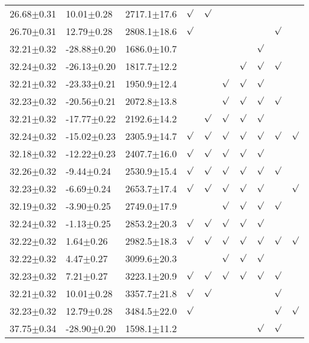 \begin{table}[h]
\begin{center}
\begin{tabular}{llllllllll}
26.68$\pm$0.31 & 10.01$\pm$0.28 & 2717.1$\pm$17.6& $\surd$ & $\surd$ & & & & & \\
26.70$\pm$0.31 & 12.79$\pm$0.28 & 2808.1$\pm$18.6& $\surd$ & & & & & $\surd$ & \\
32.21$\pm$0.32 & -28.88$\pm$0.20 & 1686.0$\pm$10.7& & & & & $\surd$ & & \\
32.24$\pm$0.32 & -26.13$\pm$0.20 & 1817.7$\pm$12.2& & & & $\surd$ & $\surd$ & $\surd$ & \\
32.21$\pm$0.32 & -23.33$\pm$0.21 & 1950.9$\pm$12.4& & & $\surd$ & $\surd$ & $\surd$ & & \\
32.23$\pm$0.32 & -20.56$\pm$0.21 & 2072.8$\pm$13.8& & & $\surd$ & $\surd$ & $\surd$ & $\surd$ & \\
32.21$\pm$0.32 & -17.77$\pm$0.22 & 2192.6$\pm$14.2& & $\surd$ & $\surd$ & $\surd$ & $\surd$ & & \\
32.24$\pm$0.32 & -15.02$\pm$0.23 & 2305.9$\pm$14.7& $\surd$ & $\surd$ & $\surd$ & $\surd$ & $\surd$ & $\surd$ & $\surd$ \\
32.18$\pm$0.32 & -12.22$\pm$0.23 & 2407.7$\pm$16.0& $\surd$ & $\surd$ & $\surd$ & $\surd$ & $\surd$ & & \\
32.26$\pm$0.32 & -9.44$\pm$0.24 & 2530.9$\pm$15.4& $\surd$ & $\surd$ & $\surd$ & $\surd$ & $\surd$ & $\surd$ & \\
32.23$\pm$0.32 & -6.69$\pm$0.24 & 2653.7$\pm$17.4& $\surd$ & $\surd$ & $\surd$ & $\surd$ & $\surd$ & & $\surd$ \\
32.19$\pm$0.32 & -3.90$\pm$0.25 & 2749.0$\pm$17.9& & & $\surd$ & $\surd$ & $\surd$ & $\surd$ & \\
32.24$\pm$0.32 & -1.13$\pm$0.25 & 2853.2$\pm$20.3& $\surd$ & $\surd$ & $\surd$ & $\surd$ & $\surd$ & & \\
32.22$\pm$0.32 & 1.64$\pm$0.26 & 2982.5$\pm$18.3& $\surd$ & $\surd$ & $\surd$ & $\surd$ & $\surd$ & $\surd$ & $\surd$ \\
32.22$\pm$0.32 & 4.47$\pm$0.27 & 3099.6$\pm$20.3& & & $\surd$ & $\surd$ & $\surd$ & & \\
32.23$\pm$0.32 & 7.21$\pm$0.27 & 3223.1$\pm$20.9& $\surd$ & $\surd$ & $\surd$ & $\surd$ & $\surd$ & $\surd$ & \\
32.21$\pm$0.32 & 10.01$\pm$0.28 & 3357.7$\pm$21.8& $\surd$ & $\surd$ & & & & $\surd$ & \\
32.23$\pm$0.32 & 12.79$\pm$0.28 & 3484.5$\pm$22.0& $\surd$ & & & & & $\surd$ & $\surd$ \\
37.75$\pm$0.34 & -28.90$\pm$0.20 & 1598.1$\pm$11.2& & & & & $\surd$ & $\surd$ & \\

\end{tabular}
\end{center}
\end{table}
